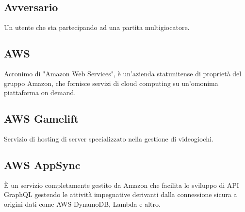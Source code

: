 	\subsection{Avversario}
	    Un utente che sta partecipando ad una partita multigiocatore.
	    
	\subsection{AWS}
		Acronimo di "Amazon Web Services", è un'azienda statunitense di proprietà del gruppo Amazon, che fornisce servizi di cloud computing su un'omonima piattaforma on demand.
	\subsection{AWS Gamelift}
        		Servizio di hosting di server specializzato nella gestione di videogiochi.
	\subsection{AWS AppSync}
	    È un servizio completamente gestito da Amazon che facilita lo sviluppo di API GraphQL gestendo le attività impegnative derivanti dalla connessione sicura a origini dati come AWS DynamoDB, Lambda e altro.
\newpage